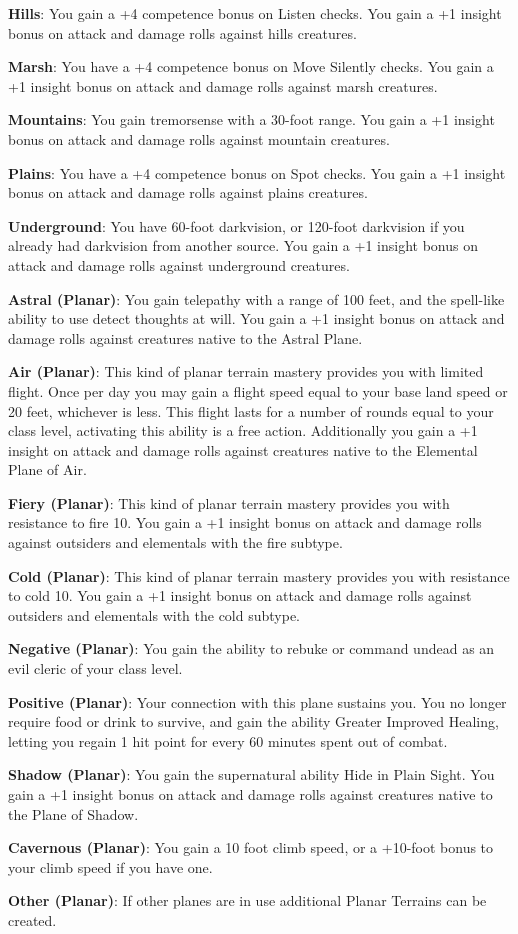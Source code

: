 \textbf{Hills}: You gain a +4 competence bonus on Listen checks. You gain a +1 insight bonus on attack and damage rolls against hills creatures.

\textbf{Marsh}: You have a +4 competence bonus on Move Silently checks. You gain a +1 insight bonus on attack and damage rolls against marsh creatures.

\textbf{Mountains}:  You gain tremorsense with a 30-foot range. You gain a +1 insight bonus on attack and damage rolls against mountain creatures.

\textbf{Plains}: You have a +4 competence bonus on Spot checks. You gain a +1 insight bonus on attack and damage rolls against plains creatures.

\textbf{Underground}: You have 60-foot darkvision, or 120-foot darkvision if you already had darkvision from another source. You gain a +1 insight bonus on attack and damage rolls against underground creatures.

\textbf{Astral (Planar)}: You gain telepathy with a range of 100 feet, and the spell-like ability to use detect thoughts at will. You gain a +1 insight bonus on attack and damage rolls against creatures native to the Astral Plane.

\textbf{Air (Planar)}: This kind of planar terrain mastery provides you with limited flight. Once per day you may gain a flight speed equal to your base land speed or 20 feet, whichever is less. This flight lasts for a number of rounds equal to your class level, activating this ability is a free action. Additionally you gain a +1 insight on attack and damage rolls against creatures native to the Elemental Plane of Air.

\textbf{Fiery (Planar)}: This kind of planar terrain mastery provides you with resistance to fire 10. You gain a +1 insight bonus on attack and damage rolls against outsiders and elementals with the fire subtype.

\textbf{Cold (Planar)}: This kind of planar terrain mastery provides you with resistance to cold 10. You gain a +1 insight bonus on attack and damage rolls against outsiders and elementals with the cold subtype.

\textbf{Negative (Planar)}: You gain the ability to rebuke or command undead as an evil cleric of your class level.

\textbf{Positive (Planar)}: Your connection with this plane sustains you. You no longer require food or drink to survive, and gain the ability Greater Improved Healing, letting you regain 1 hit point for every 60 minutes spent out of combat.

\textbf{Shadow (Planar)}: You gain the supernatural ability Hide in Plain Sight. You gain a +1 insight bonus on attack and damage rolls against creatures native to the Plane of Shadow.

\textbf{Cavernous (Planar)}: You gain a 10 foot climb speed, or a +10-foot bonus to your climb speed if you have one.

\textbf{Other (Planar)}: If other planes are in use additional Planar Terrains can be created.